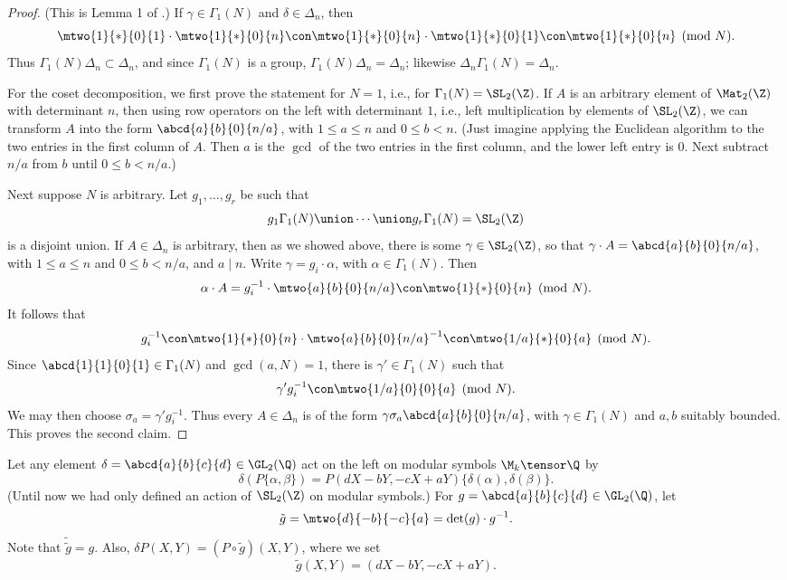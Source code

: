 \begin{proof}
(This is Lemma 1 of \cite[\S2.3]{merel:1585}.)
If $\gamma\in\Gamma_1(N)$ and $\delta\in\Delta_n$, then
$$
\mtwo{1}{*}{0}{1} \cdot \mtwo{1}{*}{0}{n} \con 
\mtwo{1}{*}{0}{n} \cdot \mtwo{1}{*}{0}{1}
\con \mtwo{1}{*}{0}{n}\pmod{N}.
$$ 
Thus $\Gamma_1(N)\Delta_n \subset \Delta_n$, and since $\Gamma_1(N)$
is a group, $\Gamma_1(N)\Delta_n = \Delta_n$; likewise 
$\Delta_n\Gamma_1(N) = \Delta_n$.

For the coset decomposition, we first prove the statement for $N=1$, i.e., for 
$\Gamma_1(N)=\SL_2(\Z)$.   If $A$ is an arbitrary element
of $\Mat_2(\Z)$ with determinant $n$, then using row operators on the left
with determinant $1$, i.e., left multiplication by elements of $\SL_2(\Z)$,
we can transform $A$ into the form $\abcd{a}{b}{0}{n/a}$, with
$1\leq a\leq n$ and $0\leq b < n$.  (Just imagine applying the Euclidean
algorithm to the two entries in the first column of $A$.  Then $a$
is the $\gcd$ of the two entries in the first column, and the lower left
entry is $0$.  Next subtract $n/a$ from $b$ until $0\leq b < n/a$.)

Next suppose $N$ is arbitrary.  Let $g_1, \ldots, g_r$ be such
that $$g_1\Gamma_1(N) \union \cdots \union g_r \Gamma_1(N) = \SL_2(\Z)$$
is a disjoint union.  If $A \in \Delta_n$ is arbitrary, then 
as we showed above, there is some $\gamma\in\SL_2(\Z)$, so that
$\gamma\cdot A = \abcd{a}{b}{0}{n/a}$, with $1\leq a \leq n$ and 
$0\leq b < n/a$, and $a\mid n$.   Write $\gamma = g_i \cdot \alpha$, with $\alpha\in\Gamma_1(N)$.
Then 
$$
  \alpha\cdot A = g_i^{-1} \cdot \mtwo{a}{b}{0}{n/a} \con \mtwo{1}{*}{0}{n}\pmod{N}.
$$
It follows that 
$$
  g_i^{-1} \con \mtwo{1}{*}{0}{n} \cdot \mtwo{a}{b}{0}{n/a}^{-1} 
    \con \mtwo{1/a}{*}{0}{a}\pmod{N}.
$$
Since $\abcd{1}{1}{0}{1}\in \Gamma_1(N)$ and $\gcd(a,N)=1$,
there is $\gamma'\in\Gamma_1(N)$ such
that $$\gamma' g_i^{-1} \con \mtwo{1/a}{0}{0}{a}\pmod{N}.$$
We may then choose $\sigma_a = \gamma' g_i^{-1}$.
Thus every $A\in \Delta_n$ is of the form
$\gamma \sigma_a \abcd{a}{b}{0}{n/a}$,
with $\gamma\in\Gamma_1(N)$ and $a,b$ suitably bounded.  This
proves the second claim.
\end{proof}

Let any element $\delta=\abcd{a}{b}{c}{d}\in\GL_2(\Q)$
act on the left on modular symbols $\M_k\tensor\Q$ by
$$
\delta(P\{\alpha,\beta\}) = P(dX-bY,-cX+aY) \{\delta(\alpha),\delta(\beta)\}.
$$
(Until now we had only defined an action of $\SL_2(\Z)$
on modular symbols.)
For $g=\abcd{a}{b}{c}{d}\in \GL_2(\Q)$, let
\begin{equation}\label{eqn:gtilde}
 \tilde{g} = \mtwo{\hfill{}d}{-b}{-c}{\hfill{}a}
           = \det(g)\cdot g^{-1}.
         \end{equation}
Note that $\tilde{\tilde{g}} = g$.  
Also, $\delta P(X,Y)=(P\circ \tilde{g})(X,Y)$,
where we set $$\tilde{g}(X,Y) = (dX-bY,-cX+aY).$$


